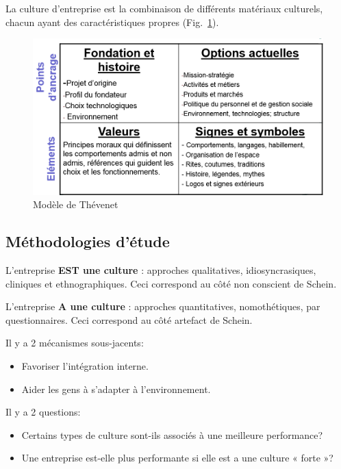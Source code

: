 \documentclass[12pt]{article}
\begin{document}
	La culture d'entreprise est la combinaison de différents matériaux culturels, chacun ayant des caractéristiques propres (Fig.~\ref{thevenet}).
	
	\begin{figure}[h]
	   \begin{center}
	    \includegraphics[width=0.65\linewidth]{thevenet.png}
	    \caption{Modèle de Thévenet}
	    \label{thevenet}
	   \end{center}
	  \end{figure}
	
	
	\subsection{Méthodologies d'étude}
		L'entreprise \textbf{EST une culture} : approches qualitatives, idiosyncrasiques, cliniques et ethnographiques. Ceci correspond au côté non conscient de Schein.\newline
		
		L'entreprise \textbf{A une culture} : approches quantitatives, nomothétiques, par questionnaires. Ceci correspond au côté artefact de Schein. \newline
		
		Il y a 2 mécanismes sous-jacents:
		\begin{itemize}
		\item Favoriser l'intégration interne.
		\item Aider les gens à s'adapter à l'environnement. \newline
		\end{itemize}
		
		Il y a 2 questions:
		\begin{itemize}
		\item Certains types de culture sont-ils associés à une meilleure performance?
		\item Une entreprise est-elle plus performante si elle est a une culture « forte »?
		\end{itemize}
\end{document}
